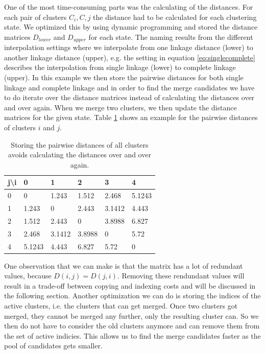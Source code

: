 One of the most time-consuming parts was the calculating of the distances. For each pair of clusters $C_i, C,j$ the distance had to be calculated for each clustering state. We optimized this by using dynamic programming and stored the distance matrices $D_{lower}$ and $D_{upper}$ for each state. The naming results from the different interpolation settings where we interpolate from one linkage distance (lower) to another linkage distance (upper), e.g. the setting in equation \ref{eq:singlecomplete} describes the interpolation from single linkage (lower) to complete linkage (upper). In this example we then store the pairwise distances for both single linkage and complete linkage and in order to find the merge candidates we have to do iterate over the distance matrices instead of calculating the distances over and over again. When we merge two clusters, we then update the distance matrices for the given state. Table \ref{dp:distances} shows an example for the pairwise distances of clusters $i$ and $j$.

\begin{table}[H]
    \centering
    \begin{tabular}{|l | l l l l l|}
    \hline
    j\textbackslash i & 0 & 1 & 2 & 3 & 4\\ \hline
    0 & 0 & 1.243 & 1.512 & 2.468 & 5.1243\\
    1 & 1.243 & 0 & 2.443 & 3.1412 & 4.443\\
    2 & 1.512 & 2.443 & 0 & 3.8988 & 6.827\\
    3 & 2.468 & 3.1412 & 3.8988 & 0 & 5.72\\
    4 & 5.1243 & 4.443 & 6.827 & 5.72 & 0\\ \hline
    \end{tabular}
    \caption{Storing the pairwise distances of all clusters avoids calculating the distances over and over again.}
    \label{dp:distances}
\end{table}

One observation that we can make is that the matrix has a lot of redundant values, because $D(i,j) = D(j,i)$. Removing these rendundant values will result in a trade-off between copying and indexing costs and will be discussed in the following section. Another optimization we can do is storing the indices of the active clusters, i.e. the clusters that can get merged. Once two clusters got merged, they cannot be merged any further, only the resulting cluster can. So we then do not have to consider the old clusters anymore and can remove them from the set of active indicies. This allows us to find the merge candidates faster as the pool of candidates gets smaller.

